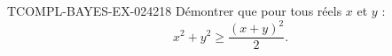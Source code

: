 \begin{exercice}{TCOMPL-BAYES-EX-024}{2}{18}
Démontrer que pour tous réels $x$ et $y$ :
\[ x^2 + y^2 \geq \frac{(x+y)^2}{2}. \]

\end{exercice}
